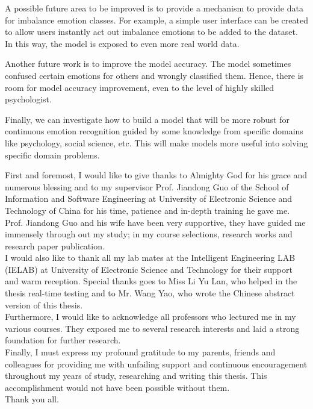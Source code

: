 \documentclass[master]{thesis-uestc}
\begin{document}
A possible future area to be improved is to provide a mechanism to provide data for imbalance emotion classes. For example, a simple user interface can be created to allow users instantly act out imbalance emotions to be added to the dataset. In this way, the model is exposed to even more real world data.

Another future work is to improve the model accuracy. The model sometimes confused certain emotions for others and wrongly classified them. Hence, there is room for model accuracy improvement, even to the level of highly skilled psychologist.

Finally, we can investigate how to build a model that will be more robust for continuous emotion recognition guided by some knowledge from specific domains like psychology, social science, etc. This will make models more useful into solving specific domain problems.

\thesisacknowledgement
First and foremost, I would like to give thanks to Almighty God for his grace and numerous blessing and to my supervisor Prof. Jiandong Guo of the School of Information and Software Engineering at University of Electronic Science and Technology of China for his time, patience and in-depth training he gave me. Prof. Jiandong Guo and his wife have been very supportive, they have guided me immensely through out my study; in my course selections, research works and research paper publication.\\
I would also like to thank all my lab mates at the Intelligent Engineering LAB (IELAB) at University of Electronic Science and Technology for their support and warm reception. Special thanks goes to Miss Li Yu Lan, who helped in the thesis real-time testing and to Mr. Wang Yao, who wrote the Chinese abstract version of this thesis.\\
Furthermore, I would like to acknowledge all professors who lectured me in my various courses. They exposed me to several research interests and laid a strong foundation for further research.\\
Finally, I must express my profound gratitude to my parents, friends and colleagues for providing me with unfailing support and continuous encouragement throughout my years of study, researching and writing this thesis. This accomplishment would not have been possible without them. \\
Thank you all.



%
% 
%


%
\end{document}
